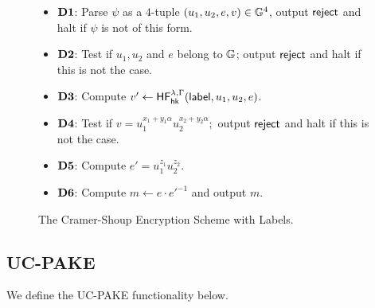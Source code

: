 \begin{figure}
\begin{framed}
		\begin{itemize}
			\itemsep=0em
			\item[]\textbf{$\mathbf{D1}$}: Parse $\psi$ as a $4$-tuple $(u_1,u_2,e,v)\in\mathbb{G}^4$, output $\mathsf{reject}$ and halt if $\psi$ is not of this form.
			\item[]\textbf{$\mathbf{D2}$}: Test if $u_1, u_2$ and $e$ belong to $\mathbb{G}$; output $\mathsf{reject}$ and halt if this is not the case.
			\item[]\textbf{$\mathbf{D3}$}: Compute $v'\gets\mathsf{HF}^{\lambda,\Gamma}_{\mathsf{hk}}(\mathsf{label},u_1,u_2,e)$.
			\item[]\textbf{$\mathbf{D4}$}: Test if $v = u_1^{x_1+y_1\alpha}u_2^{x_2+y_2\alpha};$ output $\mathsf{reject}$ and halt if this is not the case.
			\item[]\textbf{$\mathbf{D5}$}: Compute $e' = u_1^{z_1}u_2^{z_2}$.
			\item[]\textbf{$\mathbf{D6}$}: Compute $m\gets e\cdot {e'}^{-1}$ and output $m$.
		\end{itemize}
	\end{framed}
	\caption{The Cramer-Shoup Encryption Scheme with Labels.}
	\label{fig:cs03}
	\end{figure}

	\subsection{UC-PAKE}
	
	We define the UC-PAKE functionality below.
	
%			

